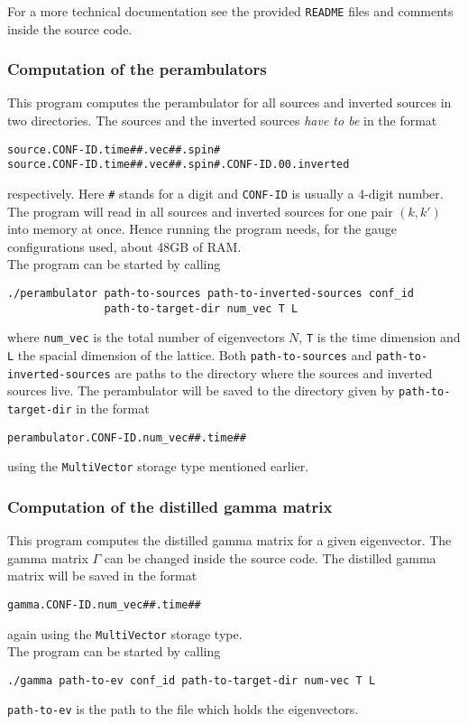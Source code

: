     For a more technical documentation see the provided \verb+README+ files and comments inside the source code.
    
    \subsubsection{Computation of the perambulators}
        This program computes the perambulator for all sources and inverted sources in two directories.
        The sources and the inverted sources \emph{have to be} in the format
        \begin{verbatim}
source.CONF-ID.time##.vec##.spin#
source.CONF-ID.time##.vec##.spin#.CONF-ID.00.inverted\end{verbatim}
        respectively. Here \verb+#+ stands for a digit and \verb+CONF-ID+ is usually a 4-digit number. The program will read in all sources and inverted sources for one pair $(k,k')$ into memory at once. Hence running the program needs, for the gauge configurations used, about 48GB of RAM.\\
        
        \noindent
        The program can be started by calling
        \begin{verbatim}
./perambulator path-to-sources path-to-inverted-sources conf_id
               path-to-target-dir num_vec T L\end{verbatim}
        where \verb+num_vec+ is the total number of eigenvectors $N$, \verb+T+ is the time dimension and \verb+L+ the spacial dimension of the lattice. Both \verb+path-to-sources+ and \verb+path-to-inverted-sources+ are paths to the directory where the sources and inverted sources live. The perambulator will be saved to the directory given by \verb+path-to-target-dir+ in the format
        \begin{verbatim}
perambulator.CONF-ID.num_vec##.time##\end{verbatim}
        using the \verb+MultiVector+ storage type mentioned earlier.
    
    \subsubsection{Computation of the distilled gamma matrix}
        This program computes the distilled gamma matrix for a given eigenvector. The gamma matrix $\Gamma$ can be changed inside the source code. The distilled gamma matrix will be saved in the format
        \begin{verbatim}
gamma.CONF-ID.num_vec##.time##\end{verbatim}
        again using the \verb+MultiVector+ storage type.\\
        The program can be started by calling
        \begin{verbatim}
./gamma path-to-ev conf_id path-to-target-dir num-vec T L\end{verbatim}
        \verb+path-to-ev+ is the path to the file which holds the eigenvectors.
        
